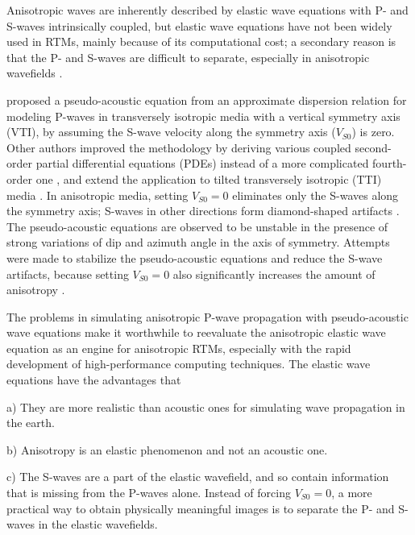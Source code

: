 \documentclass[manuscript,ulem,graphix,revised]{geophysics}
\begin{document}
Anisotropic waves are inherently described by elastic wave equations with P- and S-waves intrinsically coupled, but elastic wave equations have not been widely used in RTMs, mainly because of its computational cost;\marginnote{[3]} a secondary reason is that the P- and S-waves are difficult to separate, especially in anisotropic wavefields \citep{dellinger90}. 

\marginnote{[5]}\citet{alkhalifah98} proposed a pseudo-acoustic equation from an approximate dispersion relation for modeling P-waves in transversely isotropic media with a vertical symmetry axis (VTI), by assuming the S-wave velocity along the symmetry axis ($V_{S0}$) is zero.\marginnote{[21]} Other authors improved the methodology by deriving various coupled second-order partial differential equations (PDEs) instead of a more complicated fourth-order one \citep{alkhalifah00,klie01,hestholm07,du08,fowler10}, and extend the application to tilted transversely isotropic (TTI) media \citep{zhou06}. \marginnote{[6]}In anisotropic media, setting $V_{S0}=0$ eliminates only the S-waves along the symmetry axis; S-waves in other directions form diamond-shaped artifacts \citep{grechka04}. 
The pseudo-acoustic equations\marginnote{[7]} are observed to be unstable \citep{fletcher08, zhang08} in the presence of strong variations of dip and azimuth angle in the axis of symmetry. Attempts were made to stabilize the pseudo-acoustic equations and reduce the S-wave artifacts, because setting $V_{S0}=0$ also significantly increases the amount of anisotropy \citep{alkhalifah00, fletcher09,zhang11}. \marginnote{[21]}

\marginnote{[8]}The problems in simulating anisotropic P-wave propagation with pseudo-acoustic wave equations make it worthwhile to reevaluate the anisotropic elastic wave equation as an engine for anisotropic RTMs, especially with the rapid development of high-performance computing techniques. The elastic wave equations have the advantages that

\begin{hangparas}{.25in}{1}
a) They are more realistic than acoustic ones for simulating wave propagation in the earth.

b) Anisotropy is an elastic phenomenon and not an acoustic one.\marginnote{[10]}

c) The\marginnote{[9]} S-waves are a part of the elastic wavefield, and so contain information that is missing from the P-waves alone. Instead of forcing $V_{S0}=0$,\marginnote{[9]} a more practical way to obtain physically meaningful images is to separate the P- and S-waves in the elastic wavefields. 
\end{hangparas}
\end{document}
